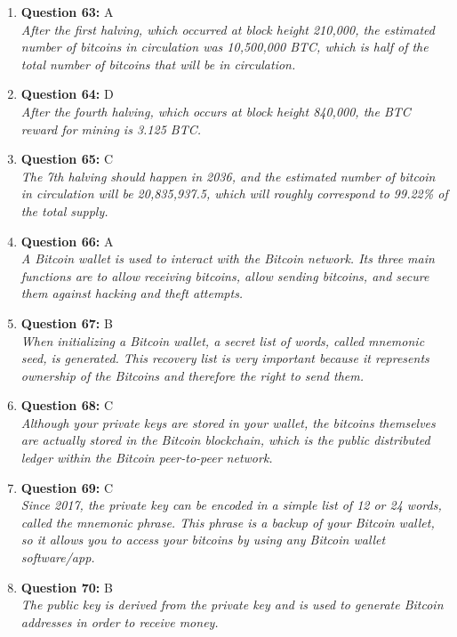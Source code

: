 \documentclass[12pt,a4paper]{article}
\begin{document}
\begin{enumerate}
\item \textbf{Question 63:} A
\\ \textit{After the first halving, which occurred at block height 210,000, the estimated number of bitcoins in circulation was 10,500,000 BTC, which is half of the total number of bitcoins that will be in circulation.}

\item \textbf{Question 64:} D
\\ \textit{After the fourth halving, which occurs at block height 840,000, the BTC reward for mining is 3.125 BTC.}

\item \textbf{Question 65:} C
\\ \textit{The 7th halving should happen in 2036, and the estimated number of bitcoin in circulation will be 20,835,937.5, which will roughly correspond to 99.22\% of the total supply.}

\item \textbf{Question 66:} A
\\ \textit{A Bitcoin wallet is used to interact with the Bitcoin network. Its three main functions are to allow receiving bitcoins, allow sending bitcoins, and secure them against hacking and theft attempts.}

\item \textbf{Question 67:} B
\\ \textit{When initializing a Bitcoin wallet, a secret list of words, called mnemonic seed, is generated. This recovery list is very important because it represents ownership of the Bitcoins and therefore the right to send them.}

\item \textbf{Question 68:} C
\\ \textit{Although your private keys are stored in your wallet, the bitcoins themselves are actually stored in the Bitcoin blockchain, which is the public distributed ledger within the Bitcoin peer-to-peer network.}

\item \textbf{Question 69:} C
\\ \textit{Since 2017, the private key can be encoded in a simple list of 12 or 24 words, called the mnemonic phrase. This phrase is a backup of your Bitcoin wallet, so it allows you to access your bitcoins by using any Bitcoin wallet software/app.}

\item \textbf{Question 70:} B
\\ \textit{The public key is derived from the private key and is used to generate Bitcoin addresses in order to receive money.}


\end{enumerate}
\end{document}
